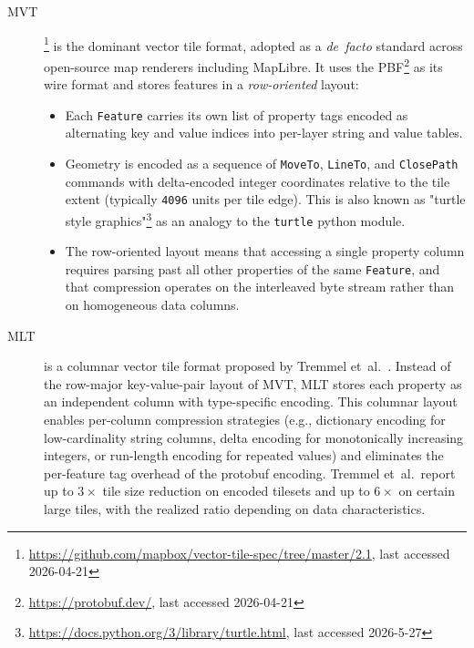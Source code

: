 \begin{description}
    \item[\acf{MVT}]\footnote{\url{https://github.com/mapbox/vector-tile-spec/tree/master/2.1}, last accessed 2026-04-21} is the dominant vector tile format, adopted as a \emph{de~facto} standard across open-source map renderers including MapLibre.
    It uses the \ac{PBF}\footnote{\url{https://protobuf.dev/}, last accessed 2026-04-21} as its wire format and stores features in a \emph{row-oriented} layout:
\begin{itemize}
    \item Each \texttt{Feature} carries its own list of property tags encoded as alternating key and value indices into per-layer string and value tables.
    \item Geometry is encoded as a sequence of \texttt{MoveTo}, \texttt{LineTo}, and \texttt{ClosePath} commands with delta-encoded integer coordinates relative to the tile extent (typically \texttt{4096} units per tile edge).
    This is also known as "turtle style graphics"\footnote{\url{https://docs.python.org/3/library/turtle.html}, last accessed 2026-5-27} as an analogy to the \texttt{turtle} python module.
    \item The row-oriented layout means that accessing a single property column requires parsing past all other properties of the same \texttt{Feature}, and that compression operates on the interleaved byte stream rather than on homogeneous data columns.
\end{itemize}


    \item[\acf{MLT}] \begin{sloppypar} is a columnar vector tile format proposed by Tremmel et~al.~\cite{tremmelMapLibreTileNext2025b}.
    Instead of the row-major key-value-pair layout of \ac{MVT}, \ac{MLT} stores each property as an independent column with type-specific encoding.
    This columnar layout enables per-column compression strategies (e.g., dictionary encoding for low-cardinality string columns, delta encoding for monotonically increasing integers, or run-length encoding for repeated values) and eliminates the per-feature tag overhead of the protobuf encoding.
    Tremmel et~al.\ report up to $3\times$ tile size reduction on encoded tilesets and up to $6\times$ on certain large tiles, with the realized ratio depending on data characteristics.\end{sloppypar}
\end{description}

